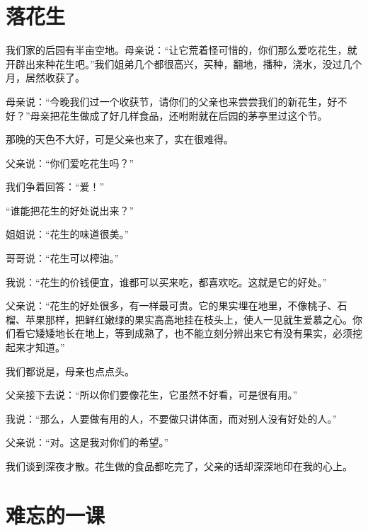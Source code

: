 \documentclass[12pt,UTF-8,openany]{ctexbook}
\begin{document}
\chapter{落花生}

\begin{Large}
    
    我们家的后园有半亩空地。母亲说：“让它荒着怪可惜的，你们那么爱吃花生，就开辟出来种花生吧。”我们姐弟几个都很高兴，买种，翻地，播种，浇水，没过几个月，居然收获了。
    
    母亲说：“今晚我们过一个收获节，请你们的父亲也来尝尝我们的新花生，好不好？”母亲把花生做成了好几样食品，还咐附就在后园的茅亭里过这个节。
    
    那晚的天色不大好，可是父亲也来了，实在很难得。
    
    父亲说：“你们爱吃花生吗？”
    
    我们争着回答：“爱！”
    
    “谁能把花生的好处说出来？”
    
    姐姐说：“花生的味道很美。”
    
    哥哥说：“花生可以榨油。”
    
    我说：“花生的价钱便宜，谁都可以买来吃，都喜欢吃。这就是它的好处。”
    
    父亲说：“花生的好处很多，有一样最可贵。它的果实埋在地里，不像桃子、石榴、苹果那样，把鲜红嫩绿的果实高高地挂在枝头上，使人一见就生爱慕之心。你们看它矮矮地长在地上，等到成熟了，也不能立刻分辨出来它有没有果实，必须挖起来才知道。”
    
    我们都说是，母亲也点点头。
    
    父亲接下去说：“所以你们要像花生，它虽然不好看，可是很有用。”
    
    我说：“那么，人要做有用的人，不要做只讲体面，而对别人没有好处的人。”
    
    父亲说：“对。这是我对你们的希望。”
    
    我们谈到深夜才散。花生做的食品都吃完了，父亲的话却深深地印在我的心上。
    
\end{Large}

\chapter{难忘的一课}
\end{document}
